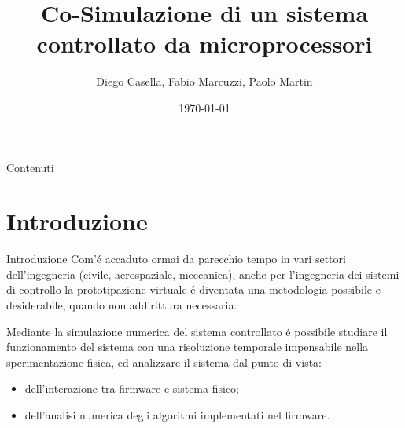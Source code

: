 \documentclass{beamer}
\title{Co-Simulazione di un sistema controllato da microprocessori}
\author{Diego Casella, Fabio Marcuzzi, Paolo Martin}
\date{\today}
\begin{document}
\maketitle

\begin{frame}{Contenuti} %
\tableofcontents
\end{frame}

\section{Introduzione}
\begin{frame}{Introduzione}
Com'\'e accaduto ormai da parecchio tempo in vari settori dell'ingegneria (civile, aerospaziale, meccanica),
anche per l'ingegneria dei sistemi di controllo la prototipazione virtuale \'e diventata una metodologia
possibile e desiderabile, quando non addirittura necessaria. 

\bigskip

Mediante la simulazione numerica del sistema controllato \'e possibile studiare il funzionamento del sistema
con una risoluzione temporale impensabile nella sperimentazione fisica, ed analizzare il sistema dal punto di vista:
\begin{itemize}
\item dell'interazione tra firmware e sistema fisico;
\item dell'analisi numerica degli algoritmi implementati nel firmware.
\end{itemize}


\end{frame}

\end{document}
